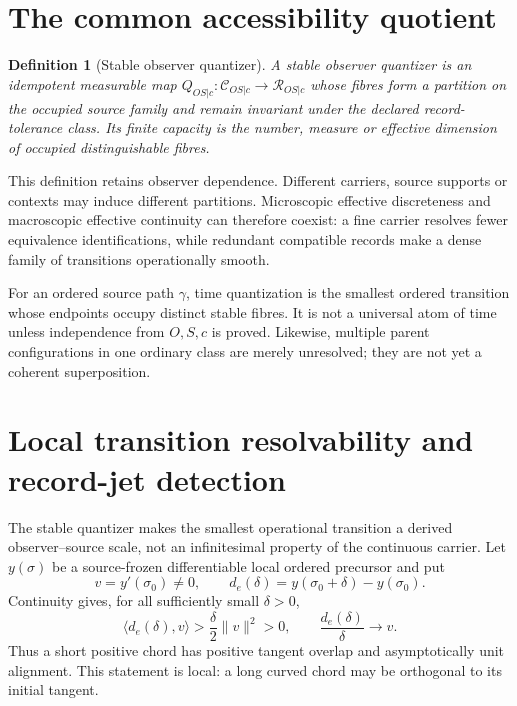 \documentclass[11pt]{article}
\newtheorem{definition}{Definition}
\begin{document}
\section{The common accessibility quotient}

\begin{definition}[Stable observer quantizer]
A stable observer quantizer is an idempotent measurable map
$Q_{OS|c}:\mathcal C_{OS|c}\to\mathcal R_{OS|c}$ whose fibres form a
partition on the occupied source family and remain invariant under the
declared record-tolerance class.  Its finite capacity is the number, measure
or effective dimension of occupied distinguishable fibres.
\end{definition}

This definition retains observer dependence.  Different carriers, source
supports or contexts may induce different partitions.  Microscopic effective
discreteness and macroscopic effective continuity can therefore coexist: a
fine carrier resolves fewer equivalence identifications, while redundant
compatible records make a dense family of transitions operationally smooth.

For an ordered source path $\gamma$, time quantization is the smallest ordered
transition whose endpoints occupy distinct stable fibres.  It is not a
universal atom of time unless independence from $O,S,c$ is proved.  Likewise,
multiple parent configurations in one ordinary class are merely unresolved;
they are not yet a coherent superposition.

\section{Local transition resolvability and record-jet detection}

The stable quantizer makes the smallest operational transition a derived
observer--source scale, not an infinitesimal property of the continuous
carrier.  Let $y(\sigma)$ be a source-frozen differentiable local ordered
precursor and put
\begin{equation}
 v=y'(\sigma_0)\ne0,
 \qquad
 d_e(\delta)=y(\sigma_0+\delta)-y(\sigma_0).
 \label{eq:local-ordered-chord}
\end{equation}
Continuity gives, for all sufficiently small $\delta>0$,
\begin{equation}
 \langle d_e(\delta),v\rangle
 >\frac{\delta}{2}\lVert v\rVert^2>0,
 \qquad
 \frac{d_e(\delta)}{\delta}\longrightarrow v.
 \label{eq:local-positive-overlap}
\end{equation}
Thus a short positive chord has positive tangent overlap and asymptotically
unit alignment.  This statement is local: a long curved chord may be
orthogonal to its initial tangent.
\end{document}
